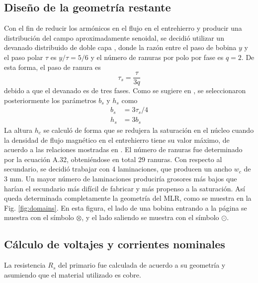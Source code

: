 \subsection{Diseño de la geometría restante}
Con el fin de reducir los armónicos en el flujo en el entrehierro y producir una distribución del campo aproximadamente senoidal, se decidió utilizar un devanado distribuido de doble capa \cite{chapman2003}, donde la razón entre el paso de bobina $y$ y el paso polar $\tau$ es $y/\tau=5/6$ y el número de ranuras por polo por fase es $q = 2$. De esta forma, el paso de ranura es
\begin{equation}
\tau_s = \frac{\tau}{3q}
\end{equation}
debido a que el devanado es de tres fases. Como se sugiere en \cite{boldea2013}, se seleccionaron posteriormente los parámetros $b_s$ y $h_s$ como
\begin{align*}
b_s &= 3\tau_s/4\\
h_s &= 3b_s
\end{align*}
La altura $h_c$ se calculó de forma que se redujera la saturación en el núcleo cuando la densidad de flujo magnético en el entrehierro tiene su valor máximo, de acuerdo a las relaciones mostradas en \cite{boldea2010}. El número de ranuras fue determinado por la ecuación A.32, obteniéndose en total 29 ranuras.
Con respecto al secundario, se decidió trabajar con 4 laminaciones, que producen un ancho $w_c$ de 3 mm. Un mayor número de laminaciones produciría grosores más bajos que harían el secundario más difícil de fabricar y más propenso a la saturación. Así queda determinada completamente la geometría del MLR, como se muestra en la Fig. \ref{fig:domains}. En esta figura, el lado de una bobina entrando a la página se muestra con el símbolo $\otimes$, y el lado saliendo se muestra con el símbolo $\odot$.

\subsection{Cálculo de voltajes y corrientes nominales}
La resistencia $R_s$ del primario fue calculada de acuerdo a su geometría y asumiendo que el material utilizado es cobre.

